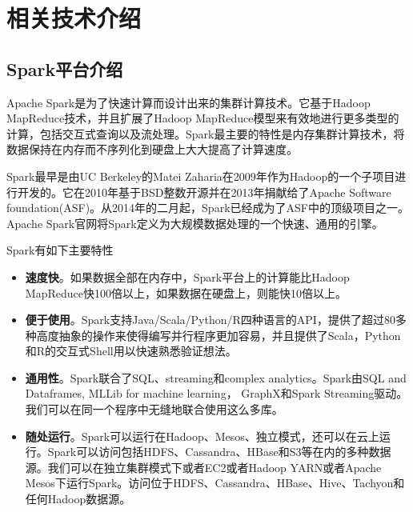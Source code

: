 \chapter{相关技术介绍}
\section{Spark平台介绍}
Apache Spark\cite{zaharia2010spark}是为了快速计算而设计出来的集群计算技术。它基于Hadoop MapReduce技术，并且扩展了Hadoop MapReduce模型来有效地进行更多类型的计算，包括交互式查询以及流处理。Spark最主要的特性是内存集群计算技术，将数据保持在内存而不序列化到硬盘上大大提高了计算速度。

Spark最早是由UC Berkeley的Matei Zaharia在2009年作为Hadoop的一个子项目进行开发的。它在2010年基于BSD整数开源并在2013年捐献给了Apache Software foundation(ASF)。从2014年的二月起，Spark已经成为了ASF中的顶级项目之一。Apache Spark官网将Spark定义为大规模数据处理的一个快速、通用的引擎。

Spark有如下主要特性
\begin{itemize}
    \item \textbf{速度快}。如果数据全部在内存中，Spark平台上的计算能比Hadoop MapReduce快100倍以上，如果数据在硬盘上，则能快10倍以上。
    \item \textbf{便于使用}。Spark支持Java/Scala/Python/R四种语言的API，提供了超过80多种高度抽象的操作来使得编写并行程序更加容易，并且提供了Scala，Python和R的交互式Shell用以快速熟悉验证想法。
    \item \textbf{通用性}。Spark联合了SQL、streaming和complex analytics。Spark由SQL and Dataframes, MLLib for machine learning\cite{meng2015mllib}， GraphX和Spark Streaming驱动。我们可以在同一个程序中无缝地联合使用这么多库。
    \item \textbf{随处运行}。Spark可以运行在Hadoop、Mesos、独立模式，还可以在云上运行。Spark可以访问包括HDFS、Cassandra、HBase和S3等在内的多种数据源。我们可以在独立集群模式下或者EC2或者Hadoop YARN或者Apache Mesos下运行Spark。访问位于HDFS、Cassandra、HBase、Hive、Tachyon和任何Hadoop数据源。
\end{itemize}

